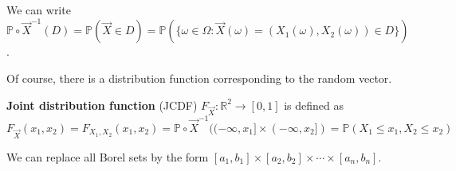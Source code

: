 \documentclass{huhtakm-template-book}
\newcommand{\prob}{\mathbb{P}}
\begin{document}
\begin{rem}
	We can write $\prob\circ\vec{X}^{-1}(D)=\prob(\vec{X}\in D)=\prob(\{\omega\in\Omega:\vec{X}(\omega)=(X_{1}(\omega),X_{2}(\omega))\in D\})$.
\end{rem}
Of course, there is a distribution function corresponding to the random vector.
\begin{defn}
	\textbf{Joint distribution function} (JCDF) $F_{\vec{X}}:\mathbb{R}^{2}\to [0,1]$ is defined as
	\begin{equation*}
		F_{\vec{X}}(x_{1},x_{2})=F_{X_{1},X_{2}}(x_{1},x_{2})=\prob\circ\vec{X}^{-1}((-\infty,x_{1}]\times(-\infty,x_{2}])=\prob(X_{1}\leq x_{1},X_{2}\leq x_{2})
	\end{equation*}
\end{defn}
\begin{rem}
	We can replace all Borel sets by the form $[a_{1},b_{1}]\times[a_{2},b_{2}]\times\cdots\times[a_{n},b_{n}]$.
\end{rem}
\end{document}
